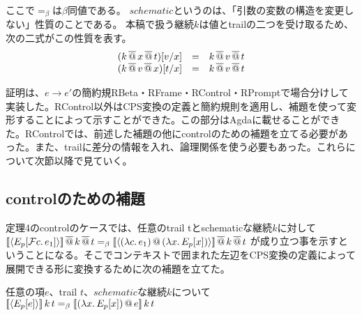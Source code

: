 ここで$=_{\beta}$は$\beta$同値である。
$schematic$というのは、「引数の変数の構造を変更しない」性質のことである。
本稿で扱う継続$k$は値とtrailの二つを受け取るため、
次の二式がこの性質を表す。\\
\[
\begin{array}{lcl}
  (k \SAppS x \SAppS t)[\Change{x}{v}] & = & k \SAppS v \SAppS t\\
  (k \SAppS v \SAppS x)[\Change{x}{t}] & = & k \SAppS v \SAppS t\\
\end{array}
\]

証明は、$e \to e'$の簡約規\textsf{RBeta}・\textsf{RFrame}・\textsf{RControl}・\textsf{RPrompt}で場合分けして実装した。\textsf{RControl}以外はCPS変換の定義と簡約規則を適用し、補題を使って変形することによって示すことができた。この部分はAgdaに載せることができた。\textsf{RControl}では、前述した補題の他にcontrolのための補題を立てる必要があった。また、trailに差分の情報を入れ、論理関係を使う必要もあった。これらについて次節以降で見ていく。


\subsection{controlのための補題}
定理4のcontrolのケースでは、任意のtrail tとschematicな継続$k$に対して\\
$\CPSTh{\Prompt{E_p[\Control{c}{e_1}]}}\SAppS k \SAppS t =_{\beta} \CPSTh{\Prompt{\App{\LamP{c}{e_1}}{\LamP{x}{E_p[x]}}}} \SAppS k \SAppS t$ が成り立つ事を示すということになる。そこでコンテキストで囲まれた左辺をCPS変換の定義によって展開できる形に変換するために次の補題を立てた。

\begin{lemma}
  任意の項$e$、\textsf{trail} $t$、$schematic$な継続$k$について\\
  $\CPSTh{\Prompt{E_p[e]}}\,k\,t =_{\beta} \CPSTh{\App{\LamP{x}{E_p[x]}}{e}}\,k\,t$
\end{lemma}

